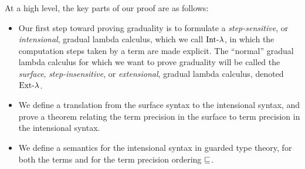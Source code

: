 At a high level, the key parts of our proof are as follows:

\begin{itemize}
  \item Our first step toward proving graduality is to formulate a \emph{step-sensitive},
  or \emph{intensional}, gradual lambda calculus, which we call $\text{Int-}\lambda$, in which the
  computation steps taken by a term are made explicit.
  The ``normal'' gradual lambda calculus for which we want to prove graduality will be called the
  \emph{surface}, \emph{step-insensitive}, or \emph{extensional}, gradual lambda calculus,
  denoted $\text{Ext-}\lambda$.

  \item We define a translation from the surface syntax to the intensional syntax, and
  prove a theorem relating the term precision in the surface to term precision in the
  intensional syntax.
  
  \item We define a semantics for the intensional syntax in guarded type theory, for both the
  terms and for the term precision ordering $\sqsubseteq$.

\end{itemize}
